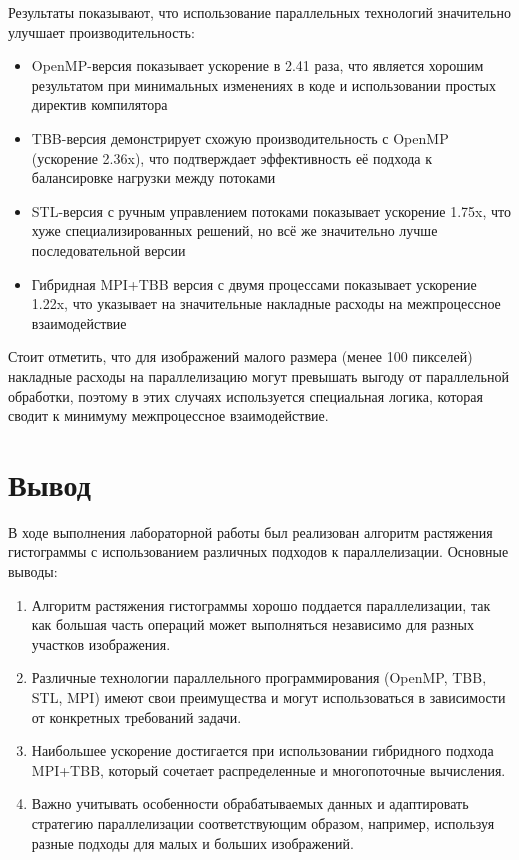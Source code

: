 \documentclass[a4paper,14pt]{article}
\begin{document}
Результаты показывают, что использование параллельных технологий значительно улучшает 
производительность:

\begin{itemize}
    \item OpenMP-версия показывает ускорение в 2.41 раза, что является хорошим результатом 
    при минимальных изменениях в коде и использовании простых директив компилятора
    
    \item TBB-версия демонстрирует схожую производительность с OpenMP (ускорение 2.36x), 
    что подтверждает эффективность её подхода к балансировке нагрузки между потоками
    
    \item STL-версия с ручным управлением потоками показывает ускорение 1.75x, что хуже 
    специализированных решений, но всё же значительно лучше последовательной версии
    
    \item Гибридная MPI+TBB версия с двумя процессами показывает ускорение 1.22x, что 
    указывает на значительные накладные расходы на межпроцессное взаимодействие
\end{itemize}

Стоит отметить, что для изображений малого размера (менее 100 пикселей) накладные расходы 
на параллелизацию могут превышать выгоду от параллельной обработки, поэтому в этих случаях 
используется специальная логика, которая сводит к минимуму межпроцессное взаимодействие.

\section{Вывод}

В ходе выполнения лабораторной работы был реализован алгоритм растяжения гистограммы 
с использованием различных подходов к параллелизации. Основные выводы:

\begin{enumerate}
    \item Алгоритм растяжения гистограммы хорошо поддается параллелизации, так как большая 
    часть операций может выполняться независимо для разных участков изображения.
    
    \item Различные технологии параллельного программирования (OpenMP, TBB, STL, MPI) 
    имеют свои преимущества и могут использоваться в зависимости от конкретных требований задачи.
    
    \item Наибольшее ускорение достигается при использовании гибридного подхода MPI+TBB, 
    который сочетает распределенные и многопоточные вычисления.
    
    \item Важно учитывать особенности обрабатываемых данных и адаптировать стратегию 
    параллелизации соответствующим образом, например, используя разные подходы для малых 
    и больших изображений.
\end{enumerate}
\end{document}
